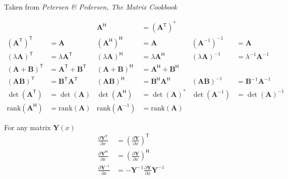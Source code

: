 Taken from \textit{Petersen \& Pedersen, The Matrix Cookbook}

{\footnotesize
    \noindent\begin{align*}
                                                          &                                                 & \mathbf{A}^\mathsf{H}                             & = {\left(\mathbf{A}^\mathsf{T}\right)}^*                                                                                       \\[.75em]
        {\left({\mathbf{A}}^\mathsf{T}\right)}^\mathsf{T} & = \mathbf{A}                                    & {\left({\mathbf{A}}^\mathsf{H}\right)}^\mathsf{H} & = \mathbf{A}                                    & {\left({\mathbf{A}}^{-1}\right)}^{-1}    & = \mathbf{A}                      \\[.75em]
        {(\lambda\mathbf{A})}^\mathsf{T}                  & = \lambda\mathbf{A}^\mathsf{T}                  & {(\lambda\mathbf{A})}^\mathsf{H}                  & = \lambda\mathbf{A}^\mathsf{H}                  & {(\lambda\mathbf{A})}^{-1}               & = \lambda^{-1}\mathbf{A}^{-1}     \\[.75em]
        {\left(\mathbf{A}+\mathbf{B}\right)}^\mathsf{T}   & = \mathbf{A}^\mathsf{T} + \mathbf{B}^\mathsf{T} & {\left(\mathbf{A}+\mathbf{B}\right)}^\mathsf{H}   & = \mathbf{A}^\mathsf{H} + \mathbf{B}^\mathsf{H}                                                                                \\[.75em]
        {\left(\mathbf{A}\mathbf{B}\right)}^\mathsf{T}    & = \mathbf{B}^\mathsf{T}\mathbf{A}^\mathsf{T}    & {\left(\mathbf{A}\mathbf{B}\right)}^\mathsf{H}    & = \mathbf{B}^\mathsf{H}\mathbf{A}^\mathsf{H}    & {\left(\mathbf{A}\mathbf{B}\right)}^{-1} & = \mathbf{B}^{-1} \mathbf{A}^{-1} \\[.75em]
        \det(\mathbf{A}^\mathsf{T})                       & = \det(\mathbf{A})                              & \det(\mathbf{A}^\mathsf{H})                       & = {\det(\mathbf{A})}^*                          & \det(\mathbf{A}^{-1})                    & = {\det(\mathbf{A})}^{-1}         \\[.75em]
        \mathrm{rank}{(\mathbf{A}^\mathsf{H})}            & = \mathrm{rank}(\mathbf{A})                     & \mathrm{rank}{(\mathbf{A}^{-1} )}                 & = \mathrm{rank}(\mathbf{A})
    \end{align*}
}


For any matrix $\mathbf{Y}(x)$
\noindent\begin{align*}
    \frac{\partial \mathbf{Y}^{\mathsf{T}}}{\partial x} & ={\left(\frac{\partial \mathbf{Y}}{\partial x}\right)}^{\mathsf{T}}   \\
    \frac{\partial \mathbf{Y}^{\mathsf{H}}}{\partial x} & ={\left(\frac{\partial \mathbf{Y}}{\partial x}\right)}^{\mathsf{H}}   \\
    \frac{\partial\mathbf{Y}^{-1}}{\partial x}          & =-\mathbf{Y}^{-1}\frac{\partial\mathbf{Y}}{\partial x}\mathbf{Y}^{-1}
\end{align*}

